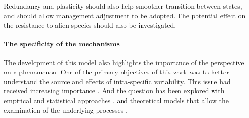 Redundancy and plasticity should also help smoother transition between states, and should allow management adjustment to be adopted. The potential effect on the resistance to alien species should also be investigated.


%
%





%

\paragraph{The specificity of the mechanisms}

The development of this model also highlights the importance of the perspective on a phenomenon. One of the primary objectives of this work was to better understand the source and effects of intra-specific variability. This issue had received increasing importance \parencite{de_bello_quantifying_2011, albert_when_2011, violle_return_2012, siefert_global_2015}. And the question has been explored with empirical and statistical approaches \parencite{jung_intraspecific_2010,  jung_intraspecific_2014, bennett_reciprocal_2016}, and theoretical models that allow the examination of the underlying processes \parencite{hart_how_2016}.

